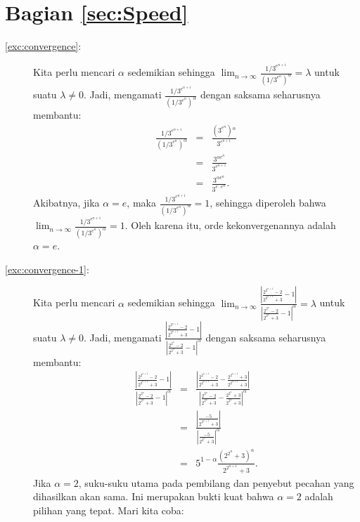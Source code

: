 \section*{Bagian \ref{sec:Speed}}
\begin{description}
\item [{\ref{exc:convergence}:}] Kita perlu mencari $\alpha$ sedemikian
sehingga $\lim_{n\to\infty}\frac{1/3^{e^{n+1}}}{\left(1/3^{e^{n}}\right)^{\alpha}}=\lambda$
untuk suatu $\lambda\neq0$. Jadi, mengamati $\frac{1/3^{e^{n+1}}}{\left(1/3^{e^{n}}\right)^{\alpha}}$
dengan saksama seharusnya membantu:
\begin{eqnarray*}
\frac{1/3^{e^{n+1}}}{\left(1/3^{e^{n}}\right)^{\alpha}} & = & \frac{\left(3^{e^{n}}\right){}^{\alpha}}{3^{e^{n+1}}}\\
 & = & \frac{3^{\alpha e^{n}}}{3^{e^{n+1}}}\\
 & = & \frac{3^{\alpha e^{n}}}{3^{e\cdot e^{n}}}.
\end{eqnarray*}
Akibatnya, jika $\alpha=e$, maka $\frac{1/3^{e^{n+1}}}{\left(1/3^{e^{n}}\right)^{\alpha}}=1$,
sehingga diperoleh bahwa $\lim_{n\to\infty}\frac{1/3^{e^{n+1}}}{\left(1/3^{e^{n}}\right)^{\alpha}}=1$.
Oleh karena itu, orde kekonvergenannya adalah $\alpha=e$.
\item [{\ref{exc:convergence-1}:}] Kita perlu mencari $\alpha$ sedemikian
sehingga $\lim_{n\to\infty}\frac{\left|\frac{2^{2^{n+1}}-2}{2^{2^{n+1}}+3}-1\right|}{\left|\frac{2^{2^{n}}-2}{2^{2^{n}}+3}-1\right|^{\alpha}}=\lambda$
untuk suatu $\lambda\neq0$. Jadi, mengamati $\frac{\left|\frac{2^{2^{n+1}}-2}{2^{2^{n+1}}+3}-1\right|}{\left|\frac{2^{2^{n}}-2}{2^{2^{n}}+3}-1\right|^{\alpha}}$
dengan saksama seharusnya membantu:
\begin{eqnarray*}
\frac{\left|\frac{2^{2^{n+1}}-2}{2^{2^{n+1}}+3}-1\right|}{\left|\frac{2^{2^{n}}-2}{2^{2^{n}}+3}-1\right|^{\alpha}} & = & \frac{\left|\frac{2^{2^{n+1}}-2}{2^{2^{n+1}}+3}-\frac{2^{2^{n+1}}+3}{2^{2^{n+1}}+3}\right|}{\left|\frac{2^{2^{n}}-2}{2^{2^{n}}+3}-\frac{2^{2^{n}}+3}{2^{2^{n}}+3}\right|^{\alpha}}\\
 & = & \frac{\left|\frac{-5}{2^{2^{n+1}}+3}\right|}{\left|\frac{-5}{2^{2^{n}}+3}\right|^{\alpha}}\\
 & = & 5^{1-\alpha}\frac{\left(2^{2^{n}}+3\right)^{\alpha}}{2^{2^{n+1}}+3}.
\end{eqnarray*}
Jika $\alpha=2$, suku-suku utama pada pembilang dan penyebut pecahan
yang dihasilkan akan sama. Ini merupakan bukti kuat bahwa $\alpha=2$
adalah pilihan yang tepat. Mari kita coba:
\begin{eqnarray*}

\end{eqnarray*}
\end{description}
